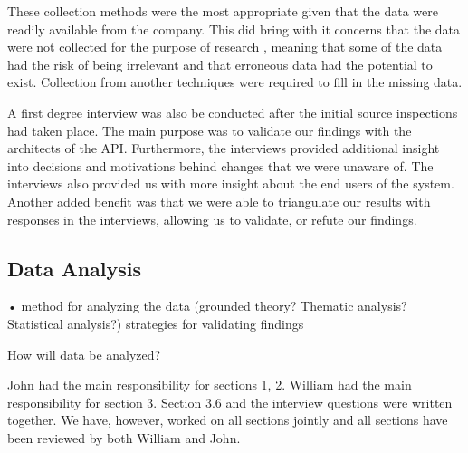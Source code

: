 \documentclass[10pt,twocolumn]{article}
\begin{document}
These collection methods were the most appropriate given that the data were readily available from the company. This did bring with it concerns that the data were not collected for the purpose of research \cite{!!! host}, meaning that some of the data had the risk of being irrelevant and that erroneous data had the potential to exist. Collection from another techniques were required to fill in the missing data.

A first degree interview was also be conducted after the initial source inspections had taken place. The main purpose was to validate our findings with the architects of the API. Furthermore, the interviews provided additional insight into decisions and motivations behind changes that we were unaware of. The interviews also provided us with more insight about the end users of the system. Another added benefit was that we were able to triangulate our results with responses in the interviews, allowing us to validate, or refute our findings.


\subsection{Data Analysis}
• method for analyzing the data (grounded theory? Thematic analysis? Statistical analysis?) strategies for validating findings

How will data be analyzed?









John had the main responsibility for sections 1, 2. William had the main responsibility for section 3. Section 3.6 and the interview questions were written together. We have, however, worked on all sections jointly and all sections have been reviewed by both William and John. 


\noindent
\end{document}
